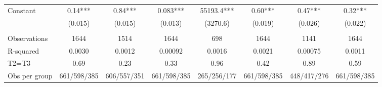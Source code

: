 \begin{tabular}{lccccccc}
Constant  & 0.14*** & 0.84*** & 0.083*** & 55193.4*** & 0.60*** & 0.47*** & 0.32*** \\
      & (0.015) & (0.015) & (0.013) & (3270.6) & (0.019) & (0.026) & (0.022) \\
      &       &       &       &       &       &       &  \\
\midrule
Observations & 1644  & 1514  & 1644  & 698   & 1644  & 1141  & 1644 \\
R-squared & 0.0030 & 0.0012 & 0.00092 & 0.0016 & 0.0021 & 0.00075 & 0.0011 \\
T2=T3 & 0.69  & 0.23  & 0.33  & 0.96  & 0.42  & 0.89  & 0.59 \\
Obs per group & 661/598/385 & 606/557/351 & 661/598/385 & 265/256/177 & 661/598/385 & 448/417/276 & 661/598/385 \\
\bottomrule
\bottomrule
\end{tabular}%
